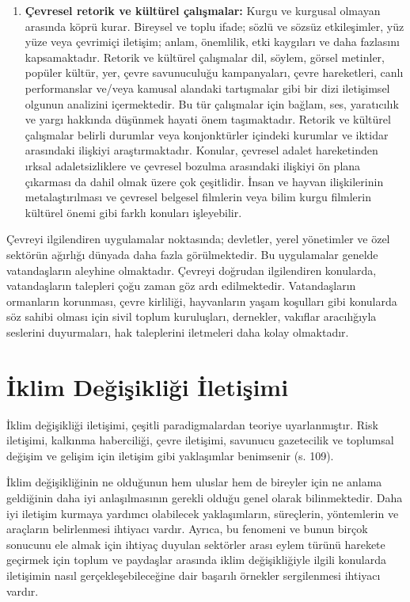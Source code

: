 \documentclass[
]{book}
\begin{document}
\begin{enumerate}
\item
  \textbf{Çevresel retorik ve kültürel çalışmalar:} Kurgu ve kurgusal olmayan arasında köprü kurar. Bireysel ve toplu ifade; sözlü ve sözsüz etkileşimler, yüz yüze veya çevrimiçi iletişim; anlam, önemlilik, etki kaygıları ve daha fazlasını kapsamaktadır. Retorik ve kültürel çalışmalar dil, söylem, görsel metinler, popüler kültür, yer, çevre savunuculuğu kampanyaları, çevre hareketleri, canlı performanslar ve/veya kamusal alandaki tartışmalar gibi bir dizi iletişimsel olgunun analizini içermektedir. Bu tür çalışmalar için bağlam, ses, yaratıcılık ve yargı hakkında düşünmek hayati önem taşımaktadır. Retorik ve kültürel çalışmalar belirli durumlar veya konjonktürler içindeki kurumlar ve iktidar arasındaki ilişkiyi araştırmaktadır. Konular, çevresel adalet hareketinden ırksal adaletsizliklere ve çevresel bozulma arasındaki ilişkiyi ön plana çıkarması da dahil olmak üzere çok çeşitlidir. İnsan ve hayvan ilişkilerinin metalaştırılması ve çevresel belgesel filmlerin veya bilim kurgu filmlerin kültürel önemi gibi farklı konuları işleyebilir.
\end{enumerate}

Çevreyi ilgilendiren uygulamalar noktasında; devletler, yerel yönetimler ve özel sektörün ağırlığı dünyada daha fazla görülmektedir. Bu uygulamalar genelde vatandaşların aleyhine olmaktadır. Çevreyi doğrudan ilgilendiren konularda, vatandaşların talepleri çoğu zaman göz ardı edilmektedir. Vatandaşların ormanların korunması, çevre kirliliği, hayvanların yaşam koşulları gibi konularda söz sahibi olması için sivil toplum kuruluşları, dernekler, vakıflar aracılığıyla seslerini duyurmaları, hak taleplerini iletmeleri daha kolay olmaktadır.

\hypertarget{iklim-deux11fiux15fikliux11fi-iletiux15fimi}{%
\section{İklim Değişikliği İletişimi}\label{iklim-deux11fiux15fikliux11fi-iletiux15fimi}}

İklim değişikliği iletişimi, çeşitli paradigmalardan teoriye uyarlanmıştır. Risk iletişimi, kalkınma haberciliği, çevre iletişimi, savunucu gazetecilik ve toplumsal değişim ve gelişim için iletişim gibi yaklaşımlar benimsenir (s. 109). \citep{evans2018communicating}

İklim değişikliğinin ne olduğunun hem uluslar hem de bireyler için ne anlama geldiğinin daha iyi anlaşılmasının gerekli olduğu genel olarak bilinmektedir. Daha iyi iletişim kurmaya yardımcı olabilecek yaklaşımların, süreçlerin, yöntemlerin ve araçların belirlenmesi ihtiyacı vardır. Ayrıca, bu fenomeni ve bunun birçok sonucunu ele almak için ihtiyaç duyulan sektörler arası eylem türünü harekete geçirmek için toplum ve paydaşlar arasında iklim değişikliğiyle ilgili konularda iletişimin nasıl gerçekleşebileceğine dair başarılı örnekler sergilenmesi ihtiyacı vardır.
\end{document}
